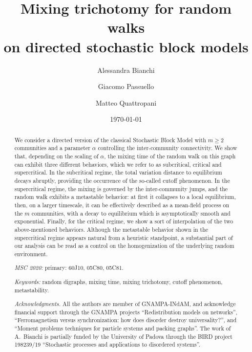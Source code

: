 \documentclass[11pt,oneside]{amsart}
\numberwithin{equation}{section}  %
\theoremstyle{plain}
\begin{document}
\title[Mixing trichotomy for RW on directed SBM]{Mixing trichotomy for random walks\\on directed stochastic block models}

\author{Alessandra Bianchi}
\address{Dipartimento di Matematica "Tullio Levi-Civita",
Universit\`a di Padova, Via Trieste 63, 35121 Padova, Italy.}
\author{Giacomo Passuello}
\address{Dipartimento di Matematica "Tullio Levi-Civita",
	Universit\`a di Padova, Via Trieste 63, 35121 Padova, Italy.}
\author{Matteo Quattropani}
\address{Dipartimento di Matematica e Fisica,
	Universit\`a degli Studi Roma Tre, Via della Vasca Navale 84, 00146 Roma, Italy.}

\date{\today}
	\begin{abstract}
		We consider a directed version of the classical Stochastic Block Model with $m\ge 2$ communities and a parameter $\alpha$ controlling the inter-community connectivity. We show that, depending on the scaling of $\alpha$, the mixing time of the random walk on this graph can exhibit three different behaviors, which we refer to as subcritical, critical and supercritical. In the subcritical regime, the total variation distance to equilibrium decays abruptly, providing the occurrence of the so-called cutoff phenomenon. In the supercritical regime, the mixing is governed by the inter-community jumps, and the random walk exhibits a metastable behavior: at first it collapses to a local equilibrium, then, on a larger timescale, it
can be effectively described as a mean-field process on the $m$ communities, with a decay to equilibrium which is asymptotically smooth and exponential. Finally, for the critical regime, we show a sort of interpolation of the two above-mentioned behaviors. 
Although the metastable behavior shown in the supercritical regime appears natural from a heuristic standpoint,
a substantial part of our analysis can be read as a control on the homogenization of the underlying random environment.

   \par\bigskip\noindent
   {\it MSC 2020:} primary:  60J10, 05C80, 05C81.
   \par\smallskip\noindent
   {\it Keywords:}  random  digraphs, mixing time, mixing trichotomy, cutoff phenomenon, metastability.\\

    \par\smallskip\noindent
    {\it Acknowledgments.} All the authors are member of GNAMPA-INdAM, and acknowledge financial support through the GNAMPA projects ``Redistribution models on networks'',  
     ``Ferromagnetism versus synchronization: how does disorder destroy universality?'', and ``Moment problems techniques for particle systems and packing graphs''.
     The work of A.~Bianchi is partially funded by the University of Padova through the BIRD project 198239/19  ``Stochastic processes and applications to disordered systems''.
	\end{abstract}
\end{document}
